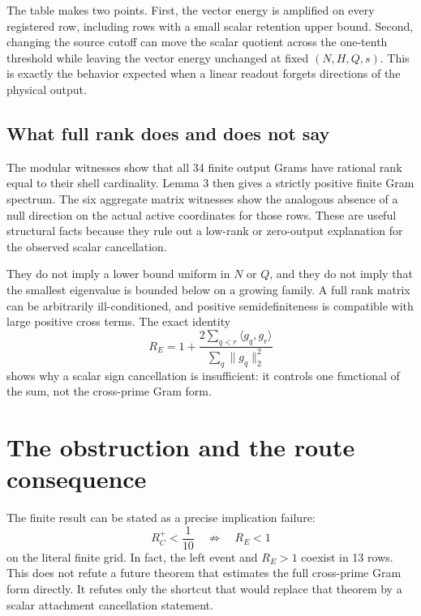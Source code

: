\documentclass[11pt]{article}
\begin{document}
The table makes two points.  First, the vector energy is amplified on every
registered row, including rows with a small scalar retention upper bound.
Second, changing the source cutoff can move the scalar quotient across the
one-tenth threshold while leaving the vector energy unchanged at fixed
$(N,H,Q,s)$.  This is exactly the behavior expected when a linear readout
forgets directions of the physical output.

\subsection{What full rank does and does not say}

The modular witnesses show that all 34 finite output Grams have rational rank
equal to their shell cardinality.  Lemma 3 then gives a strictly positive
finite Gram spectrum.  The six aggregate matrix witnesses show the analogous
absence of a null direction on the actual active coordinates for those rows.
These are useful structural facts because they rule out a low-rank or
zero-output explanation for the observed scalar cancellation.

They do not imply a lower bound uniform in $N$ or $Q$, and they do not imply
that the smallest eigenvalue is bounded below on a growing family.  A full
rank matrix can be arbitrarily ill-conditioned, and positive semidefiniteness
is compatible with large positive cross terms.  The exact identity
\begin{equation*}
 R_E=1+\frac{2\sum_{q<r}\langle g_q,g_r\rangle}{
                    \sum_q\|g_q\|_2^2}
\end{equation*}
shows why a scalar sign cancellation is insufficient: it controls one
functional of the sum, not the cross-prime Gram form.

\section{The obstruction and the route consequence}

The finite result can be stated as a precise implication failure:
\begin{equation}
 R_C^+<\frac{1}{10}\quad\not\Longrightarrow\quad R_E<1
 \label{eq:firewall}
\end{equation}
on the literal finite grid.  In fact, the left event and $R_E>1$ coexist in
13 rows.  This does not refute a future theorem that estimates the full
cross-prime Gram form directly.  It refutes only the shortcut that would
replace that theorem by a scalar attachment cancellation statement.
\end{document}
